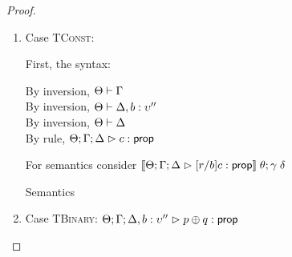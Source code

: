 \begin{proof}
\begin{enumerate}
  For semantics, consider $\interp{\judgeA[\Theta; \Gamma; \Delta]{[r/b](p\;[\tau'])}{\upsilon}}\;\theta\;\gamma\;\delta$
  \begin{eqnproof}
    {Semantics}
    {Induction}
          {Semantics}
  \end{eqnproof}


\item Case \textsc{TConst}:

  First, the syntax: 
  \begin{tabbedproof}
    \oo By inversion, $\judgectx{\Theta}{\Gamma}$ \\
    \oo By inversion, $\judgectx{\Theta}{\Delta, b:\upsilon''}$ \\
    \oo By inversion, $\judgectx{\Theta}{\Delta}$ \\
    \oo By rule, $\judgeA[\Theta; \Gamma; \Delta]{c}{\assert}$
  \end{tabbedproof}

  For semantics consider $\interp{\judgeA[\Theta; \Gamma; \Delta]{[r/b]c}{\assert}}\;\theta;\gamma\;\delta$ 
  \begin{eqnproof}
          {Semantics}
  \end{eqnproof}

\item Case \textsc{TBinary}: $\judgeA[\Theta; \Gamma; \Delta, b:\upsilon'']{p \oplus q}{\assert}$
  

\end{enumerate}
\end{proof}
